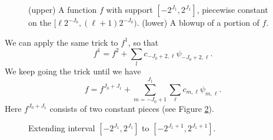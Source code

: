 \documentclass{book}
\begin{document}
\begin{figure}[h]
  \caption{\label{fig:blowup}(upper) A function $f$ with support $[- 2^{J_1},
  2^{J_1}]$, piecewise constant on the $[\ell 2^{- J_0}, (\ell + 1) 2^{- J_0})
  .$ (lower) A blowup of a portion of $f$.}
\end{figure}

We can apply the same trick to $f^1$, so that
\[ f^1 = f^2 + \sum_l c_{- J_0 + 2, \ell} \psi_{- J_0 + 2, \ell} . \]
We keep going the trick until we have
\[ f = f^{J_0 + J_1} + \sum_{m = - J_0 + 1}^{J_1} \sum_{\ell} c_{m, \ell}
   \psi_{m, \ell} . \]
Here $f^{J_0 + J_1}$ consists of two constant pieces (see Figure
\ref{fig:haarWavelet2}).

\begin{figure}[h]
  \caption{\label{fig:haarWavelet2}Extending interval $[- 2^{J_1}, 2^{J_1}]$
  to $[- 2^{J_1 + 1}, 2^{J_1 + 1}]$.}
\end{figure}
\end{document}
